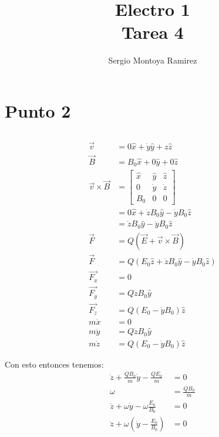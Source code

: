 \documentclass{report}
\title{\Huge{Electro 1}\\Tarea 4}
\author{\huge{Sergio Montoya Ramirez}}
\date{}
\begin{document}
\maketitle
\newpage%
\tableofcontents
\pagebreak

\chapter{Punto 2}


\section{}

\begin{align*}
	\vec{v} &= 0 \hat{x} + \dot{y} \hat{y} + z \hat{z}\\
	\vec{B} &= B_0 \hat{x} + 0 \hat{y} + 0 \hat{z}\\
	\vec{v} \times \vec{B} &= \begin{bmatrix}
		\hat{x} & \hat{y} & \hat{z}\\
		0 & \dot{y} & \dot{z} \\
		B_0 & 0 & 0
	\end{bmatrix}\\
	&= 0 \hat{x} + \dot{z}B_0 \hat{y} - \dot{y}B_0 \hat{z}\\
	&= \dot{z}B_0 \hat{y} - \dot{y}B_0 \hat{z}\\
	\vec{F} &= Q \left( \vec{E} + \vec{v} \times \vec{B} \right)\\
	\vec{F} &= Q \left( E_0 \hat{z} + \dot{z}B_0 \hat{y} - \dot{y}B_0 \hat{z} \right)\\
	\vec{F_x} &= 0\\
	\vec{F_y} &= Q \dot{z}B_0 \hat{y}\\
	\vec{F_z} &= Q \left( E_0 - \dot{y}B_0 \right) \hat{z}\\
	m \ddot{x} &= 0\\
	m \ddot{y} &= Q \dot{z}B_0 \hat{y}\\
	m \ddot{z} &= Q \left( E_0 - \dot{y}B_0 \right) \hat{z}
\end{align*}

Con esto entonces tenemos:
\begin{align*}
	\ddot{z} + \frac{Q B_0}{m}\dot{y} - \frac{Q E_0}{m} &= 0\\
	\omega &= \frac{Q B_0}{m}\\
	\ddot{z} + \omega \dot{y} - \omega \frac{E_0}{B_0} &= 0\\
	\ddot{z} + \omega \left(\dot{y} - \frac{E_0}{B_0} \right) &= 0\\
\end{align*}
\end{document}
